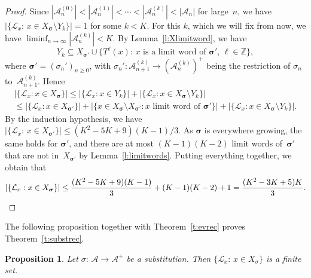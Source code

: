 \documentclass{amsart}
\newtheorem{proposition}[lemma]{Proposition}
\theoremstyle{definition}
\theoremstyle{remark}
\numberwithin{equation}{section}
\begin{document}
\begin{proof}
Since $|\mathcal{A}_n^{(0)}| < |\mathcal{A}_n^{(1)}| < \cdots < |\mathcal{A}_n^{(k)}| < |\mathcal{A}_n|$ for large~$n$, we have $|\{\mathcal{L}_x:\, x \in X_{\boldsymbol{\sigma}} \setminus Y_k\}| = 1$ for some $k < K$.
For this $k$, which we will fix from now, we have $\liminf_{n\to\infty} |\mathcal{A}_n^{(k)}| < K$. 
By Lemma~\ref{l:Xlimitword}, we have 
\[
Y_k \subseteq X_{\boldsymbol{\sigma}'} \cup \{T^\ell(x):\, \mbox{$x$ is a limit word of $\boldsymbol{\sigma}'$, $\ell \in \mathbb{Z}$}\}, 
\]
where $\boldsymbol{\sigma}' = (\sigma_n')_{n\ge0}$, with $\sigma_n': \mathcal{A}_{n+1}^{(k)} \to (\mathcal{A}_n^{(k)})^+$ being the restriction of $\sigma_n$ to~$\mathcal{A}_{n+1}^{(k)}$.
Hence
\begin{multline*}
|\{\mathcal{L}_x: x \in X_{\boldsymbol{\sigma}}\}| \le |\{\mathcal{L}_x: x \in Y_k\}| + |\{\mathcal{L}_x: x \in X_{\boldsymbol{\sigma}} \setminus Y_k\}| \\ \le |\{\mathcal{L}_x: x \in X_{\boldsymbol{\sigma}'}\}| + |\{x \in X_{\boldsymbol{\sigma}} \setminus X_{\boldsymbol{\sigma}'}: \mbox{$x$ limit word of $\boldsymbol{\sigma}'$}\}| + |\{\mathcal{L}_x: x \in X_{\boldsymbol{\sigma}} \setminus Y_k\}|.
\end{multline*}
By the induction hypothesis, we have $|\{\mathcal{L}_x:\, x \in X_{\boldsymbol{\sigma}'}\}| \le (K^2-5K+9)(K-1)/3$.
As $\boldsymbol{\sigma}$ is everywhere growing, the same holds for $\boldsymbol{\sigma}'$, and there are at most $(K-1)(K-2)$ limit words of~$\boldsymbol{\sigma}'$ that are not in~$X_{\boldsymbol{\sigma}'}$ by Lemma~\ref{l:limitwords}.
Putting everything together, we obtain that
\[
|\{\mathcal{L}_x: x \in X_{\boldsymbol{\sigma}}\}| \le \frac{(K^2-5K+9)(K-1)}{3} + (K-1)(K-2) + 1 = \frac{(K^2-3K+5)K}{3}. \qedhere
\] 
\end{proof}

The following proposition together with Theorem~\ref{t:evrec} proves Theorem~\ref{t:substrec}.

\begin{proposition} \label{p:sigmacomp}
Let $\sigma:\, \mathcal{A} \to \mathcal{A}^+$ be a substitution. 
Then $\{\mathcal{L}_x:\, x \in X_\sigma\}$ is a finite set.
\end{proposition}
\end{document}
